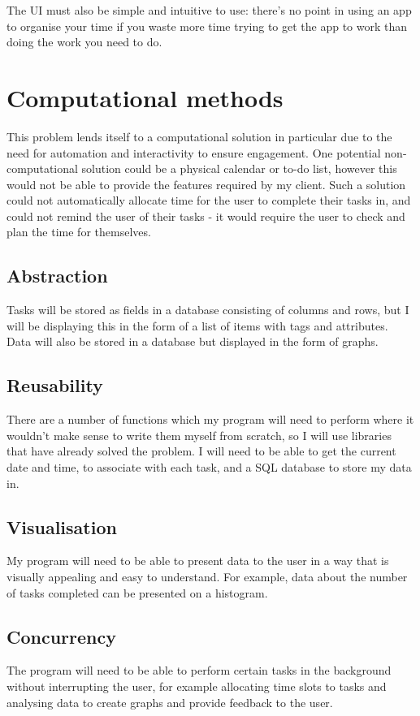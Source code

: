 \documentclass{article}
\begin{document}
The UI must also be simple and intuitive to use: there's no point in using an
app to organise your time if you waste more time trying to get the app to work
than doing the work you need to do.

\section{Computational methods}
This problem lends itself to a computational solution in particular due to the
need for automation and interactivity to ensure engagement. One potential
non-computational solution could be a physical calendar or to-do list, however
this would not be able to provide the features required by my client. Such a
solution could not automatically allocate time for the user to complete their
tasks in, and could not remind the user of their tasks - it would require the
user to check and plan the time for themselves.

\subsection{Abstraction}
Tasks will be stored as fields in a database consisting of columns and rows, but
I will be displaying this in the form of a list of items with tags and
attributes. Data will also be stored in a database but displayed in the form of
graphs.

\subsection{Reusability}
There are a number of functions which my program will need to perform where it
wouldn't make sense to write them myself from scratch, so I will use libraries
that have already solved the problem. I will need to be able to get the current
date and time, to associate with each task, and a SQL database to store my data
in.

\subsection{Visualisation}
My program will need to be able to present data to the user in a way that is
visually appealing and easy to understand. For example, data about the number of
tasks completed can be presented on a histogram.

\subsection{Concurrency}
The program will need to be able to perform certain tasks in the background
without interrupting the user, for example allocating time slots to tasks and
analysing data to create graphs and provide feedback to the user.
\end{document}
